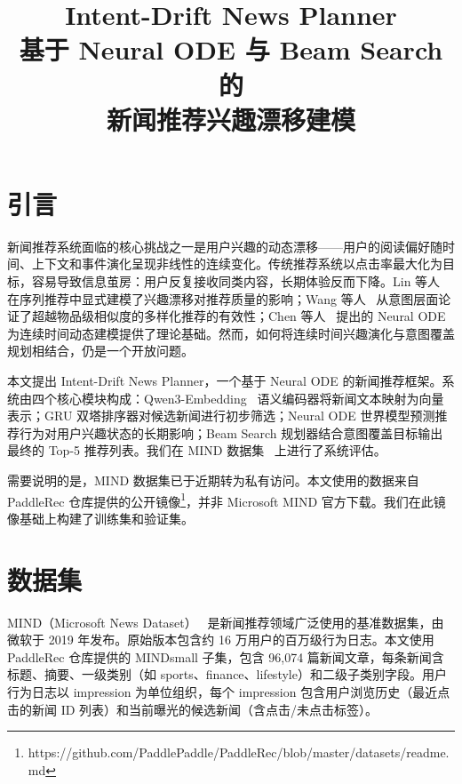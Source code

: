 \documentclass[twocolumn,10pt,a4paper]{ctexart}
\title{{\LARGE\bfseries Intent-Drift News Planner}\\[4pt]
{\large 基于 Neural ODE 与 Beam Search 的\\新闻推荐兴趣漂移建模}}
\author{}
\date{}
\begin{document}
\maketitle
\thispagestyle{fancy}

\section{引言}

新闻推荐系统面临的核心挑战之一是用户兴趣的动态漂移——用户的阅读偏好随时间、上下文和事件演化呈现非线性的连续变化。传统推荐系统以点击率最大化为目标，容易导致信息茧房：用户反复接收同类内容，长期体验反而下降。Lin 等人~\cite{lin2025interest} 在序列推荐中显式建模了兴趣漂移对推荐质量的影响；Wang 等人~\cite{wang2025intent} 从意图层面论证了超越物品级相似度的多样化推荐的有效性；Chen 等人~\cite{chen2018neural} 提出的 Neural ODE 为连续时间动态建模提供了理论基础。然而，如何将连续时间兴趣演化与意图覆盖规划相结合，仍是一个开放问题。

本文提出 Intent-Drift News Planner，一个基于 Neural ODE 的新闻推荐框架。系统由四个核心模块构成：Qwen3-Embedding~\cite{qwen3embedding} 语义编码器将新闻文本映射为向量表示；GRU 双塔排序器对候选新闻进行初步筛选；Neural ODE 世界模型预测推荐行为对用户兴趣状态的长期影响；Beam Search 规划器结合意图覆盖目标输出最终的 Top-5 推荐列表。我们在 MIND 数据集~\cite{wu2020mind} 上进行了系统评估。

需要说明的是，MIND 数据集已于近期转为私有访问。本文使用的数据来自 PaddleRec 仓库提供的公开镜像\footnote{https://github.com/PaddlePaddle/PaddleRec/blob/master/datasets/readme.md}，并非 Microsoft MIND 官方下载。我们在此镜像基础上构建了训练集和验证集。

\section{数据集}

MIND（Microsoft News Dataset）~\cite{wu2020mind} 是新闻推荐领域广泛使用的基准数据集，由微软于 2019 年发布。原始版本包含约 16 万用户的百万级行为日志。本文使用 PaddleRec 仓库提供的 MINDsmall 子集，包含 96,074 篇新闻文章，每条新闻含标题、摘要、一级类别（如 sports、finance、lifestyle）和二级子类别字段。用户行为日志以 impression 为单位组织，每个 impression 包含用户浏览历史（最近点击的新闻 ID 列表）和当前曝光的候选新闻（含点击/未点击标签）。
\end{document}

